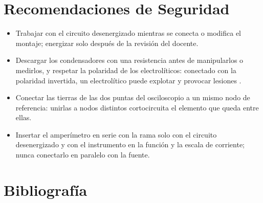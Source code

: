 \documentclass[12pt]{article}
\begin{document}
\section{Recomendaciones de Seguridad}\label{sec:seguridad}
\begin{itemize}
  \item Trabajar con el circuito desenergizado mientras se conecta o modifica el montaje; energizar solo después de la revisión del docente.
  \item Descargar los condensadores con una resistencia antes de manipularlos o medirlos, y respetar la polaridad de los electrolíticos: conectado con la polaridad invertida, un electrolítico puede explotar y provocar lesiones \cite{ref1}.
  \item Conectar las tierras de las dos puntas del osciloscopio a un mismo nodo de referencia: unirlas a nodos distintos cortocircuita el elemento que queda entre ellas.
  \item Insertar el amperímetro en serie con la rama solo con el circuito desenergizado y con el instrumento en la función y la escala de corriente; nunca conectarlo en paralelo con la fuente.
\end{itemize}

\section{Bibliografía}\label{sec:bibliografia}
\nocite{*}
\bibliografia
\end{document}
